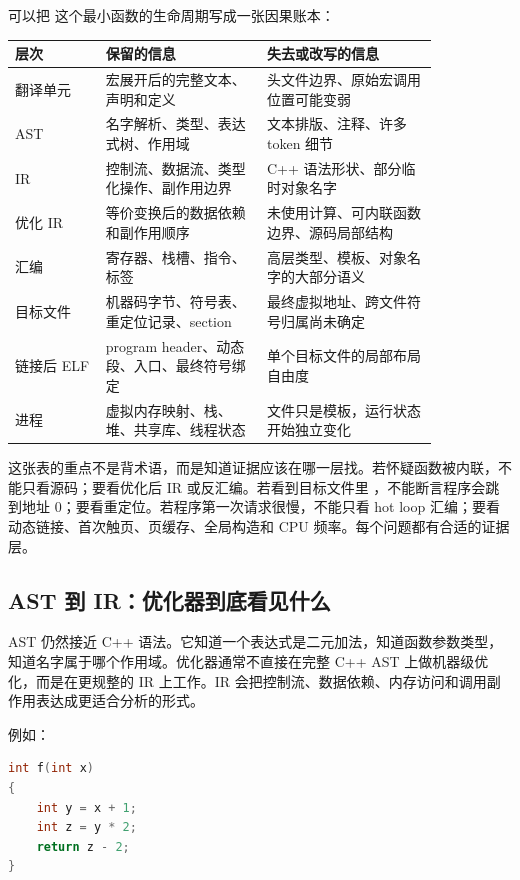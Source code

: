 可以把  这个最小函数的生命周期写成一张因果账本：

\begin{center}
\begin{tabular}{p{0.18\linewidth}p{0.32\linewidth}p{0.34\linewidth}}
\toprule
层次 & 保留的信息 & 失去或改写的信息 \\
\midrule
翻译单元 & 宏展开后的完整文本、声明和定义 & 头文件边界、原始宏调用位置可能变弱 \\
AST & 名字解析、类型、表达式树、作用域 & 文本排版、注释、许多 token 细节 \\
IR & 控制流、数据流、类型化操作、副作用边界 & C++ 语法形状、部分临时对象名字 \\
优化 IR & 等价变换后的数据依赖和副作用顺序 & 未使用计算、可内联函数边界、源码局部结构 \\
汇编 & 寄存器、栈槽、指令、标签 & 高层类型、模板、对象名字的大部分语义 \\
目标文件 & 机器码字节、符号表、重定位记录、section & 最终虚拟地址、跨文件符号归属尚未确定 \\
链接后 ELF & program header、动态段、入口、最终符号绑定 & 单个目标文件的局部布局自由度 \\
进程 & 虚拟内存映射、栈、堆、共享库、线程状态 & 文件只是模板，运行状态开始独立变化 \\
\bottomrule
\end{tabular}
\end{center}

这张表的重点不是背术语，而是知道证据应该在哪一层找。若怀疑函数被内联，不能只看源码；要看优化后 IR 或反汇编。若看到目标文件里 ，不能断言程序会跳到地址 0；要看重定位。若程序第一次请求很慢，不能只看 hot loop 汇编；要看动态链接、首次触页、页缓存、全局构造和 CPU 频率。每个问题都有合适的证据层。

\subsection{AST 到 IR：优化器到底看见什么}

AST 仍然接近 C++ 语法。它知道一个表达式是二元加法，知道函数参数类型，知道名字属于哪个作用域。优化器通常不直接在完整 C++ AST 上做机器级优化，而是在更规整的 IR 上工作。IR 会把控制流、数据依赖、内存访问和调用副作用表达成更适合分析的形式。

例如：

\begin{lstlisting}[language=C++,caption={源码层的局部变量形状}]
int f(int x)
{
    int y = x + 1;
    int z = y * 2;
    return z - 2;
}
\end{lstlisting}

